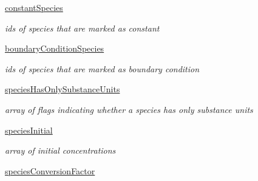 \begin{DoxyCompactItemize}
\mbox{\label{classamici_1_1sbml__import_1_1_sbml_importer_a64859da7ab190d44c8d03e004e5712fc}} 
\mbox{\hyperlink{classamici_1_1sbml__import_1_1_sbml_importer_a64859da7ab190d44c8d03e004e5712fc}{constant\+Species}}
\begin{DoxyCompactList}\small\item\em ids of species that are marked as constant \end{DoxyCompactList}\item 
\mbox{\label{classamici_1_1sbml__import_1_1_sbml_importer_ac58d33fa62dff054a1f5b77f62b90d51}} 
\mbox{\hyperlink{classamici_1_1sbml__import_1_1_sbml_importer_ac58d33fa62dff054a1f5b77f62b90d51}{boundary\+Condition\+Species}}
\begin{DoxyCompactList}\small\item\em ids of species that are marked as boundary condition \end{DoxyCompactList}\item 
\mbox{\label{classamici_1_1sbml__import_1_1_sbml_importer_a8453f8454195f14ffc556a6c44628ff5}} 
\mbox{\hyperlink{classamici_1_1sbml__import_1_1_sbml_importer_a8453f8454195f14ffc556a6c44628ff5}{species\+Has\+Only\+Substance\+Units}}
\begin{DoxyCompactList}\small\item\em array of flags indicating whether a species has only substance units \end{DoxyCompactList}\item 
\mbox{\label{classamici_1_1sbml__import_1_1_sbml_importer_a3e05f94be69384436eca705417d2d73a}} 
\mbox{\hyperlink{classamici_1_1sbml__import_1_1_sbml_importer_a3e05f94be69384436eca705417d2d73a}{species\+Initial}}
\begin{DoxyCompactList}\small\item\em array of initial concentrations \end{DoxyCompactList}\item 
\mbox{\label{classamici_1_1sbml__import_1_1_sbml_importer_ab44229958ef30724d7d8f0db13cfe46c}} 
\mbox{\hyperlink{classamici_1_1sbml__import_1_1_sbml_importer_ab44229958ef30724d7d8f0db13cfe46c}{species\+Conversion\+Factor}}

\end{DoxyCompactItemize}
